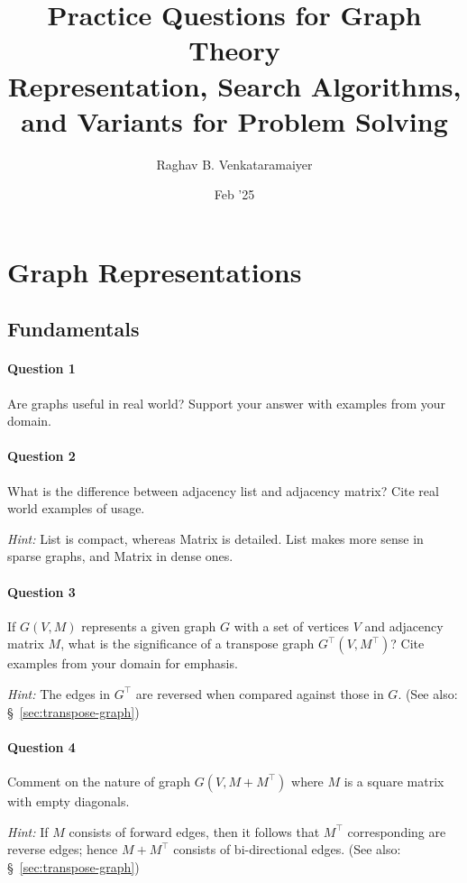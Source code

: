 \documentclass[11pt]{article}
\author{Raghav B. Venkataramaiyer}
\date{Feb '25}
\title{Practice Questions for Graph Theory\\\medskip
\large Representation, Search Algorithms, and Variants for Problem Solving}
\begin{document}
\maketitle

\section{Graph Representations}
\label{sec:org2912b19}

\subsection{Fundamentals}
\label{sec:org25f41f3}


\paragraph*{Question 1}
\label{sec:org48ec970}
Are graphs useful in real world?  Support your answer
with examples from your domain.

\paragraph*{Question 2}
\label{sec:orgc48ae40}
What is the difference between adjacency list and
adjacency matrix?  Cite real world examples of usage.

\emph{Hint:} List is compact, whereas Matrix is detailed.
List makes more sense in sparse graphs, and Matrix in
dense ones.

\paragraph*{Question 3}
\label{sec:orga3771f0}
If \(G(V,M)\) represents a given graph \(G\) with a set of
vertices \(V\) and adjacency matrix \(M\), what is the
significance of a transpose graph
\(G^{\top}(V,M^{\top})\)?  Cite examples from your domain
for emphasis.

\emph{Hint:} The edges in \(G^{\top}\) are reversed when
compared against those in \(G\).  (See also: 
\S~\ref{sec:transpose-graph})

\paragraph*{Question 4}
\label{sec:orgd03eb36}
Comment on the nature of graph \(G(V,M+M^{\top})\) where
\(M\) is a square matrix with empty diagonals.

\emph{Hint:} If \(M\) consists of forward edges, then it
follows that \(M^{\top}\) corresponding are reverse
edges; hence \(M+M^{\top}\) consists of bi-directional
edges.  (See also: 
\S~\ref{sec:transpose-graph})
\end{document}
